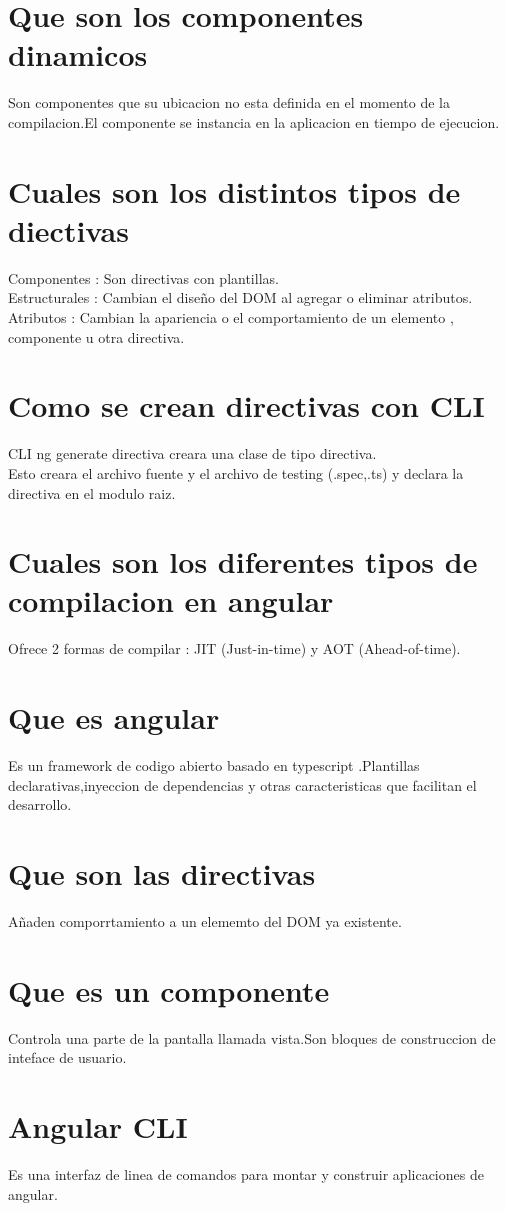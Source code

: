 \section{Que son los componentes dinamicos}
Son componentes que su ubicacion no esta definida en el momento de la compilacion.El componente se
instancia en la aplicacion en tiempo de ejecucion.
\section{Cuales son los distintos tipos de diectivas}
Componentes : Son directivas con plantillas.\\
Estructurales : Cambian el dise\~no del DOM al agregar o eliminar atributos.\\
Atributos : Cambian la apariencia o el comportamiento de un elemento , componente u otra directiva.
\section{Como se crean directivas con CLI}
CLI ng generate directiva creara una clase de tipo directiva.\\
Esto creara el archivo fuente y el archivo de testing (.spec,.ts) y declara la directiva en el modulo raiz.
\section{Cuales son los diferentes tipos de compilacion en angular}
Ofrece 2 formas de compilar : JIT (Just-in-time) y AOT (Ahead-of-time).
\section{Que es angular}
Es un framework de codigo abierto basado en typescript .Plantillas declarativas,inyeccion de dependencias y otras
caracteristicas que facilitan el desarrollo.
\section{Que son las directivas}
A\~naden comporrtamiento a un elememto del DOM ya existente.
\section{Que es un componente}
Controla una parte de la pantalla llamada vista.Son bloques de construccion de inteface de usuario.
\section{Angular CLI}
Es una interfaz de linea de comandos para montar y construir aplicaciones de angular.
